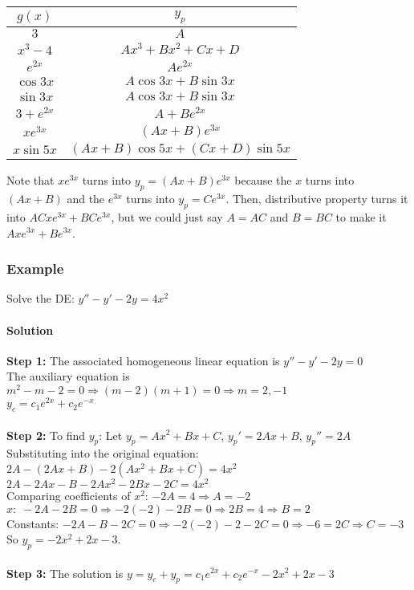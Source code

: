 \documentclass{article}
\begin{document}
\begin{center}
    \begin{tabular}{||c c||} 
     \hline
     $g(x)$ & $y_p$ \\ [0.5ex] 
     \hline\hline
     $3$ & $A$ \\ 
     \hline
     $x^3-4$ & $Ax^3+Bx^2+Cx+D$ \\
     \hline
     $e^{2x}$ & $Ae^{2x}$ \\
     \hline
     $\cos3x$ & $A\cos3x+B\sin3x$ \\
     \hline
     $\sin3x$ & $A\cos3x+B\sin3x$ \\
     \hline
     $3+e^{2x}$ & $A+Be^{2x}$ \\
     \hline
     $xe^{3x}$ & $(Ax+B)e^{3x}$ \\
     \hline
     $x\sin5x$ & $(Ax+B)\cos5x+(Cx+D)\sin5x$ \\ [1ex] 
     \hline
    \end{tabular}
\end{center}
Note that $xe^{3x}$ turns into $y_p=(Ax+B)e^{3x}$ because the $x$ turns into $(Ax+B)$ and the $e^{3x}$ turns into $y_p=Ce^{3x}$.
Then, distributive property turns it into $ACxe^{3x}+BCe^{3x}$, but we could just say $A=AC$ and $B=BC$ to make it $Axe^{3x}+Be^{3x}$.

\subsubsection{Example}
Solve the DE: $y''-y'-2y=4x^2$
\paragraph{Solution}
\textbf{Step 1:} The associated homogeneous linear equation is $y''-y'-2y=0$
\\The auxiliary equation is $m^2-m-2=0\Rightarrow(m-2)(m+1)=0\Rightarrow m=2,-1$
\\$y_c=c_1e^{2x}+c_2e^{-x}$
\\\\\textbf{Step 2:} To find $y_p$: Let $y_p=Ax^2+Bx+C$, $y_p'=2Ax+B$, $y_p''=2A$
\\Substituting into the original equation: $2A-(2Ax+B)-2(Ax^2+Bx+C)=4x^2$
\\$2A-2Ax-B-2Ax^2-2Bx-2C=4x^2$
\\Comparing coefficients of $x^2$: $-2A=4\Rightarrow A=-2$
\\$x:\; -2A-2B=0\Rightarrow-2(-2)-2B=0\Rightarrow2B=4\Rightarrow B=2$
\\Constants: $-2A-B-2C=0\Rightarrow -2(-2)-2-2C=0\Rightarrow -6=2C\Rightarrow C=-3$
\\So $y_p=-2x^2+2x-3$.
\\\\\textbf{Step 3:} The solution is $y=y_c+y_p=c_1e^{2x}+c_2e^{-x}-2x^2+2x-3$
\end{document}

